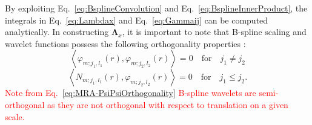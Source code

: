 \documentclass[review,authoryear,3p]{elsarticle}
\newcommand{\parham}[1]{\textcolor{red}{#1}}
\begin{document}
By exploiting Eq.~\eqref{eq:BsplineConvolution} and Eq.~\eqref{eq:BsplineInnerProduct}, the integrals in Eq.~\eqref{eq:Lambdax} and Eq.~\eqref{eq:Gammaij} can be computed analytically. In constructing $\boldsymbol\Lambda_{x}$, it is important to note that B-spline scaling and wavelet functions possess the following orthogonality properties \citep{Unser1993}: 
\begin{equation}
  \left\langle \varphi_{m;j_1,l_1}(r),\varphi_{m;j_2,l_2}(r)\right\rangle =0  \quad \mathrm{for} \quad j_1\neq j_2
 \label{eq:MRA-PsiPsiOrthogonality} 
 \end{equation}
 \begin{equation}
  \left\langle N_{m;j_1,l_1}(r),\varphi_{m;j_2,l_2}(r)\right\rangle =0  \quad \mathrm{for} \quad j_1\leq j_2.
 \label{eq:MRA-PhiPsiOrthogonality}
 \end{equation}
  \parham{Note from Eq.~\eqref{eq:MRA-PsiPsiOrthogonality} B-spline wavelets are semi-orthogonal as they are not orthogonal with respect to translation on a given scale.} 
\end{document}
